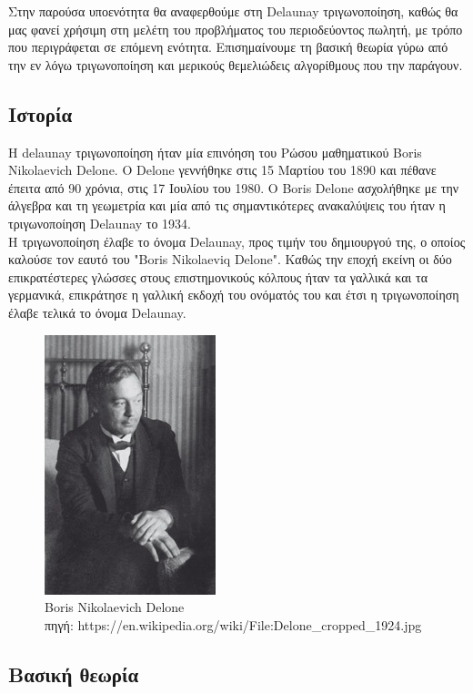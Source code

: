 \documentclass[oneside,12pt]{book}
\newenvironment{matlab}
	{\begin{figure}[hp]\centering\captionsetup{justification=centering}}
	{\end{figure}}
\theoremstyle{definition}
\begin{document}
Στην παρούσα υποενότητα θα αναφερθούμε στη Delaunay τριγωνοποίηση, καθώς θα μας φανεί χρήσιμη στη μελέτη του προβλήματος του περιοδεύοντος πωλητή, με τρόπο που περιγράφεται σε επόμενη ενότητα. Επισημαίνουμε τη βασική θεωρία γύρω από την εν λόγω τριγωνοποίηση και μερικούς θεμελιώδεις αλγορίθμους που την παράγουν. \\

\subsection{Ιστορία}

Η delaunay τριγωνοποίηση ήταν μία επινόηση του Ρώσου μαθηματικού Boris Nikolaevich Delone. Ο Delone γεννήθηκε στις 15 Μαρτίου του 1890 και πέθανε έπειτα από 90 χρόνια, στις 17 Ιουλίου του 1980. Ο Boris Delone ασχολήθηκε με την άλγεβρα και τη γεωμετρία και μία από τις σημαντικότερες ανακαλύψεις του ήταν η τριγωνοποίηση Delaunay το 1934. \\

Η τριγωνοποίηση έλαβε το όνομα Delaunay, προς τιμήν του δημιουργού της, ο οποίος καλούσε τον εαυτό του "Boris Nikolaeviq Delone". Καθώς την εποχή εκείνη οι δύο επικρατέστερες γλώσσες στους επιστημονικούς κόλπους ήταν τα γαλλικά και τα γερμανικά, επικράτησε η γαλλική εκδοχή του ονόματός του και έτσι η τριγωνοποίηση έλαβε τελικά το όνομα Delaunay. \\

\begin{matlab}
	\includegraphics[scale=0.9]{images/Delone.jpg}
	\caption{Boris Nikolaevich Delone \\ πηγή: https://en.wikipedia.org/wiki/File:Delone\_cropped\_1924.jpg}
\end{matlab} 

\subsection{Βασική θεωρία}
\end{document}

